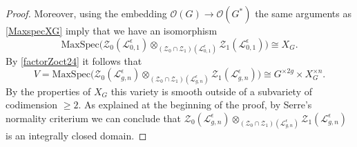 \documentclass[11pt]{amsart}
\newcommand{\e}{\epsilon}
\newcommand{\Ll}{\mathcal{L}}
\newcommand{\Oo}{\mathcal{O}}
\begin{document}
\begin{proof}
Moreover, using the embedding $\Oo(G)\to \Oo(G^*)$ the same arguments as \eqref{MaxspecXG} imply that we have an isomorphism 
\begin{equation}\label{isoMaxspecsep25}
\mathrm{MaxSpec}\bigl(\mathcal{Z}_0(\mathcal{L}_{0,1}^\e)\otimes_{(\mathcal{Z}_0 \cap \mathcal{Z}_1)(\Ll_{0,1}^\e)} \mathcal{Z}_1(\mathcal{L}_{0,1}^{\e}) \bigr) \cong X_G.
\end{equation}
By \eqref{factorZoct24} it follows that
\[ V=\mathrm{MaxSpec}\bigl( \mathcal{Z}_0(\mathcal{L}_{g,n}^{\e}) \otimes_{(\mathcal{Z}_0 \cap \mathcal{Z}_1)(\mathcal{L}_{g,n}^{\e})} \mathcal{Z}_1(\mathcal{L}_{g,n}^{\e}) \bigr)\cong G^{\times 2g}\times  X_G^{\times n}. \]
By the properties of $X_G$ this variety is smooth outside of a subvariety of codimension $\geq 2$. As explained at the beginning of the proof, by Serre's normality criterium we can conclude that $\mathcal{Z}_0(\mathcal{L}_{g,n}^{\e}) \otimes_{(\mathcal{Z}_0 \cap \mathcal{Z}_1)(\mathcal{L}_{g,n}^{\e})} \mathcal{Z}_1(\mathcal{L}_{g,n}^{\e})$ is an integrally closed domain.\end{proof}
\end{document}

